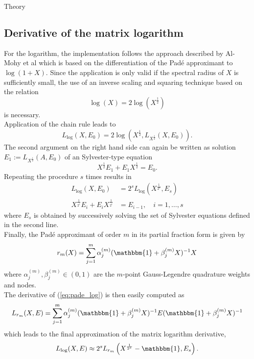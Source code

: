 \begin{chapter}{Theory}
\subsection{Derivative of the matrix logarithm} %
\label{sub:Derivative of the matrix logarithm}
For the logarithm, the implementation follows the approach described by Al-Mohy et al \cite{AlmohyFrechet} 
which is based on the differentiation of the Pad\'{e} approximant to $\log(1+X)$.
Since the application is only valid if the spectral radius of $X$ is sufficiently small, the  use of an inverse scaling and squaring technique based on the relation
\begin{equation}
    \log(X) = 2\log(X^{\frac{1}{2}})
\end{equation}
is necessary.\\

Application of the chain rule leads to
\begin{equation}
    L_{\log}(X,E_0) = 2\log\left(X^{\frac{1}{2}},L_{X^{\frac{1}{2}}}(X,E_0)\right).
\end{equation}
The second argument on the right hand side can again be written as solution $E_1:=L_{X^{\frac{1}{2}}}(A,E_0)$ of an Sylvester-type equation
\begin{equation}
    X^{\frac{1}{2}}E_1+E_{1}X^{\frac{1}{2}}=E_0.
\end{equation}
Repeating the procedure $s$ times results in
\begin{align}
    L_{\log}(X,E_0)&=2^sL_{\log}\left(X^{\frac{1}{2^s}},E_s\right)\\
    X^{\frac{1}{2^{i}}}E_i+E_iX^{\frac{1}{2^{i}}}&=E_{i-1},\quad i=1,\ldots,s
\end{align}
where $E_s$ is obtained by successively solving the set of Sylvester equations defined in the second line.\\

Finally, the Pad\'{e} approximant of order $m$ in its partial fraction form \cite{HighamPade} is given by
\begin{equation}
    \label{eq:pade_log}
    r_m(X) = \sum_{j=1}^{m}\alpha_j^{(m)}(\mathbbm{1}+\beta_j^{(m)}X)^{-1}X
\end{equation}
where $\alpha_{j}^{(m)},\beta_{j}^{(m)}\in (0,1)$ are the $m$-point Gauss-Legendre quadrature weights and nodes.\\

The derivative of (\ref{eq:pade_log}) is then easily computed as 
\begin{equation}
    L_{r_m}(X,E) = \sum_{j=1}^m\alpha_j^{(m)}(\mathbbm{1}+\beta_j^{(m)}X)^{-1}E(\mathbbm{1}+\beta_j^{(m)}X)^{-1}
\end{equation}
which leads to the final approximation of the matrix logarithm derivative, 
\begin{equation}
    \label{eq:dlog_approx}
    L_{\log}(X,E)\approx 2^{s}L_{r_m}\left(X^{\frac{1}{2^s}}-\mathbbm{1},E_s \right).
\end{equation}


\end{chapter}
